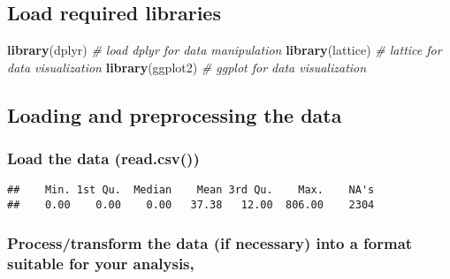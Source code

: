 \documentclass[]{article}
\newenvironment{Shaded}{\begin{snugshade}}{\end{snugshade}}
\newcommand{\CommentTok}[1]{\textcolor[rgb]{0.56,0.35,0.01}{\textit{#1}}}
\newcommand{\KeywordTok}[1]{\textcolor[rgb]{0.13,0.29,0.53}{\textbf{#1}}}
\newcommand{\NormalTok}[1]{#1}
\newcommand{\OperatorTok}[1]{\textcolor[rgb]{0.81,0.36,0.00}{\textbf{#1}}}
\newcommand{\StringTok}[1]{\textcolor[rgb]{0.31,0.60,0.02}{#1}}
\begin{document}
\hypertarget{load-required-libraries}{%
\subsection{Load required libraries}\label{load-required-libraries}}

\begin{Shaded}
\begin{Highlighting}[]
\KeywordTok{library}\NormalTok{(dplyr) }\CommentTok{# load dplyr for data manipulation}
\KeywordTok{library}\NormalTok{(lattice) }\CommentTok{# lattice for data visualization}
\KeywordTok{library}\NormalTok{(ggplot2) }\CommentTok{# ggplot for data visualization}
\end{Highlighting}
\end{Shaded}

\hypertarget{loading-and-preprocessing-the-data}{%
\subsection{Loading and preprocessing the
data}\label{loading-and-preprocessing-the-data}}

\hypertarget{load-the-data-read.csv}{%
\subsubsection{Load the data
(read.csv())}\label{load-the-data-read.csv}}

\begin{Shaded}
\end{Shaded}

\begin{verbatim}
##    Min. 1st Qu.  Median    Mean 3rd Qu.    Max.    NA's 
##    0.00    0.00    0.00   37.38   12.00  806.00    2304
\end{verbatim}

\hypertarget{processtransform-the-data-if-necessary-into-a-format-suitable-for-your-analysis}{%
\subsubsection{Process/transform the data (if necessary) into a format
suitable for your
analysis,}\label{processtransform-the-data-if-necessary-into-a-format-suitable-for-your-analysis}}
\end{document}
